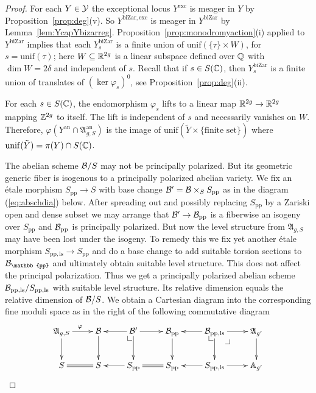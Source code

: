 \documentclass[12pt,oneside]{amsart}
\begin{document}
\begin{proof}
  For each $Y\in {\mathcal Y}$ the exceptional locus
  $Y^{\mathrm{exc}}$ is meager in $Y$ by Proposition~\ref{prop:deg}(v).
  So $Y^{\mathrm{biZar,exc}}$ is meager in $Y^{\mathrm{biZar}}$ by Lemma~\ref{lem:YcapYbizarreg}.
  Proposition~\ref{prop:monodromyaction}(i) applied to
  $Y^{\mathrm{biZar}}$ implies that each $Y^{\mathrm{biZar}}_s$ is a finite union of
  $\mathrm{unif}(\{\tau\}\times W)$, for $s=\mathrm{unif}(\tau)$; here
  $W\subseteq{\mathbb{R}}^{2g}$ is a linear subspace defined over ${\mathbb{Q}}$ with $\dim W = 2\delta$
  and independent of $s$. Recall that if
  $s\in S({\mathbb{C}})$, then $Y^{\mathrm{biZar}}_s$ is a finite union of
  translates of $(\ker\varphi_s)^0$, see Proposition~\ref{prop:deg}(ii). 

  For each $s\in S({\mathbb{C}})$, the endomorphism $\varphi_s$ lifts to a
  linear map ${\mathbb{R}}^{2g}\rightarrow{\mathbb{R}}^{2g}$ mapping ${\mathbb{Z}}^{2g}$ to itself.
  The lift is independent of $s$ and necessarily vanishes on $W$.
  Therefore, $\varphi(Y^{\mathrm{an}}\cap\mathfrak{A}_{g,S}^{\mathrm{an}})$ is the image of
  $\mathrm{unif}(\tilde Y \times\{\text{finite set}\})$
  where $\mathrm{unif}(\tilde Y) = \pi(Y)\cap S({\mathbb{C}})$.

  The abelian scheme $\mathcal{B}/S$ may not be principally polarized.
  But its geometric generic fiber is isogenous to a principally
  polarized abelian variety.
  We fix an \'etale  morphism $S_{\mathrm{pp}}\rightarrow S$  with
  base change $\mathcal{B}'=\mathcal{B}\times_S S_{\mathrm{pp}}$ as in the diagram 
  (\ref{eq:abschdia}) below. After spreading out and possibly
  replacing $S_{\mathrm{pp}}$ by a Zariski open and dense subset we may arrange that  $\mathcal{B}'\rightarrow
  \mathcal{B}_{\mathrm{pp}}$ is a fiberwise an isogeny over $S_{\mathrm{pp}}$
  and $\mathcal{B}_{\mathrm{pp}}$ is principally polarized.
  But now the level structure from $\mathfrak{A}_{g,S}$ may have been
  lost under the isogeny.  
  To remedy this we fix yet another
  \'etale morphism $S_{\mathrm{pp,ls}}\rightarrow
  S_{\mathrm{pp}}$ and do a base change to add suitable torsion sections to
  $\cB_{\mathbb{pp}}$ and ultimately  obtain suitable level structure. This does not
  affect the principal polarization.
  Thus we get a principally polarized abelian scheme
  $\mathcal{B}_{\mathrm{pp,ls}}/S_{\mathrm{pp,ls}}$ with suitable level
  structure. Its relative dimension equals the relative dimension of
  $\mathcal{B}/S$. We obtain a Cartesian diagram into
  the corresponding fine moduli space as in the right of the following
  commutative diagram
  \begin{equation}
    \label{eq:abschdia}
    \xymatrix{
\mathfrak{A}_{g,S} \ar[d]\ar[r]^{\varphi}&    \cB   \ar[d]
&\ar[l]\leftpullback \cB'\ar[d]\ar[r] & \cB_{\mathrm{pp}}  \ar[d]
&\ar[l]\leftpullback \cB_{\mathrm{pp,ls}}\ar[d] \ar[r]\pullbackcorner & \mathfrak{A}_{g'} \ar[d]\\
S\ar@{=}[r]&      S  &\ar[l] S_{\mathrm{pp}}
\ar@{=}[r]&S_{\mathrm{pp}} &\ar[l] S_{\mathrm{pp,ls}} \ar[r] 
&\IA_{g'}
    }
  \end{equation}
  

\end{proof}
\end{document}
